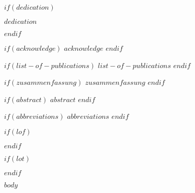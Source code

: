 \documentclass[11pt, a4paper, twosided]{book}
\begin{document}
\pagestyle{empty} %

$if(dedication)$
\vspace*{\fill}
\begin{center}
\textit{$dedication$}
\end{center}
\vspace*{\fill}
\newpage\null\thispagestyle{empty}\newpage
$endif$

\pagestyle{plain}
\setcounter{page}{1}    %
$if(acknowledge)$
\newpage
$acknowledge$
\newpage\null\thispagestyle{empty}\newpage
$endif$


$if(list-of-publications)$
    $list-of-publications$
\newpage\null\newpage
$endif$

$if(zusammenfassung)$
    $zusammenfassung$
$endif$
\newpage\null\newpage


$if(abstract)$
    $abstract$
$endif$
\newpage\null\newpage

\newpage
\tableofcontents
\clearpage

$if(abbreviations)$
\newpage
$abbreviations$
$endif$

$if(lof)$
\newpage
\listoffigures
{}
$endif$

$if(lot)$
\newpage
\listoftables
{}
$endif$


\newpage
\pagestyle{plain}
\setcounter{page}{1}    %

$body$
\end{document}
